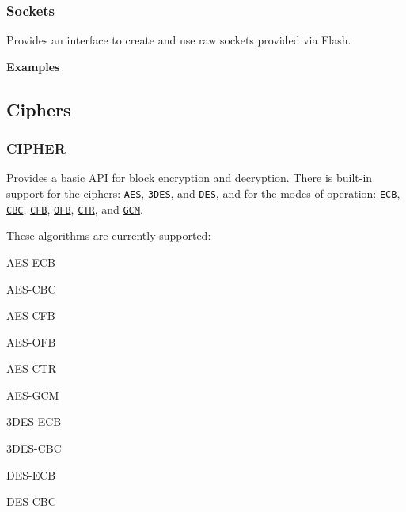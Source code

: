 \begin{DoxyCode}
\end{DoxyCode}


\label{_socket}%
 \subsubsection*{Sockets}

Provides an interface to create and use raw sockets provided via Flash.

{\bfseries Examples}


\begin{DoxyCode}
\end{DoxyCode}
 

 \subsection*{Ciphers}

\label{_cipher}%
 \subsubsection*{C\+I\+P\+H\+ER}

Provides a basic A\+PI for block encryption and decryption. There is built-\/in support for the ciphers\+: \href{http://en.wikipedia.org/wiki/Advanced_Encryption_Standard}{\tt A\+ES}, \href{http://en.wikipedia.org/wiki/Triple_DES}{\tt 3\+D\+ES}, and \href{http://en.wikipedia.org/wiki/Data_Encryption_Standard}{\tt D\+ES}, and for the modes of operation\+: \href{http://en.wikipedia.org/wiki/Block_cipher_mode_of_operation}{\tt E\+CB}, \href{http://en.wikipedia.org/wiki/Block_cipher_mode_of_operation}{\tt C\+BC}, \href{http://en.wikipedia.org/wiki/Block_cipher_mode_of_operation}{\tt C\+FB}, \href{http://en.wikipedia.org/wiki/Block_cipher_mode_of_operation}{\tt O\+FB}, \href{http://en.wikipedia.org/wiki/Block_cipher_mode_of_operation}{\tt C\+TR}, and \href{http://en.wikipedia.org/wiki/GCM_mode}{\tt G\+CM}.

These algorithms are currently supported\+:


\begin{DoxyItemize}
\item A\+E\+S-\/\+E\+CB
\item A\+E\+S-\/\+C\+BC
\item A\+E\+S-\/\+C\+FB
\item A\+E\+S-\/\+O\+FB
\item A\+E\+S-\/\+C\+TR
\item A\+E\+S-\/\+G\+CM
\item 3\+D\+E\+S-\/\+E\+CB
\item 3\+D\+E\+S-\/\+C\+BC
\item D\+E\+S-\/\+E\+CB
\item D\+E\+S-\/\+C\+BC
\end{DoxyItemize}

